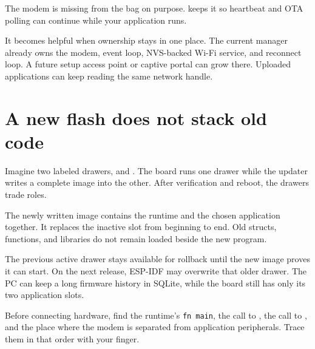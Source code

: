 The modem is missing from the bag on purpose.  keeps it so heartbeat and OTA polling can continue while your application runs.

\begin{mentorbox}
It becomes helpful when ownership stays in one place. The current manager already owns the modem, event loop, NVS-backed Wi-Fi service, and reconnect loop. A future setup access point or captive portal can grow there. Uploaded applications can keep reading the same network handle.
\end{mentorbox}

\section{A new flash does not stack old code}

Imagine two labeled drawers,  and . The board runs one drawer while the updater writes a complete image into the other. After verification and reboot, the drawers trade roles.

The newly written image contains the runtime and the chosen application together. It replaces the inactive slot from beginning to end. Old structs, functions, and libraries do not remain loaded beside the new program.

The previous active drawer stays available for rollback until the new image proves it can start. On the next release, ESP-IDF may overwrite that older drawer. The PC can keep a long firmware history in SQLite, while the board still has only its two application slots.

\begin{checkpoint}
Before connecting hardware, find the runtime's \texttt{fn main}, the call to , the call to , and the place where the modem is separated from application peripherals. Trace them in that order with your finger.
\end{checkpoint}
